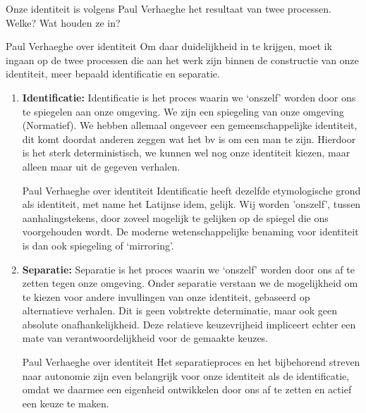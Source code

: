 \documentclass[main.tex]{subfiles}
\begin{document}
\begin{examenvraag}
    \begin{vraag}
        Onze identiteit is volgens Paul Verhaeghe het resultaat van twee processen. Welke? Wat houden ze in?
    \end{vraag}

    \begin{antwoord}
        \begin{citaat}{Paul Verhaeghe over identiteit}
            Om daar duidelijkheid in te krijgen, moet ik ingaan op de twee processen die aan het werk zijn binnen de constructie van onze identiteit, meer bepaald identificatie en separatie.
        \end{citaat}
        \begin{enumerate}
            \item \textbf{Identificatie:}
                Identificatie is het proces waarin we `onszelf' worden door ons te spiegelen aan onze omgeving.
                We zijn een spiegeling van onze omgeving (Normatief). We hebben allemaal
                ongeveer een gemeenschappelijke identiteit, dit komt doordat anderen zeggen wat het bv is
                om een man te zijn. Hierdoor is het sterk deterministisch, we kunnen wel nog onze identiteit
                kiezen, maar alleen maar uit de gegeven verhalen.
                \begin{citaat}{Paul Verhaeghe over identiteit}
                    Identificatie heeft dezelfde etymologische grond als identiteit, met name het Latijnse idem, gelijk.
                    Wij worden 'onszelf', tussen aanhalingstekens, door zoveel mogelijk te gelijken op de spiegel die ons voorgehouden wordt.
                    De moderne wetenschappelijke benaming voor identiteit is dan ook spiegeling of `mirroring'.
                \end{citaat}
            \item \textbf{Separatie:}
                Separatie is het proces waarin we `onszelf' worden door ons af te zetten tegen onze omgeving.
                Onder separatie verstaan we de mogelijkheid om te kiezen voor andere
                invullingen van onze identiteit, gebaseerd op alternatieve verhalen. Dit is geen volstrekte
                determinatie, maar ook geen absolute onafhankelijkheid. Deze relatieve keuzevrijheid
                impliceert echter een mate van verantwoordelijkheid voor de gemaakte keuzes.
                \begin{citaat}{Paul Verhaeghe over identiteit}
                Het separatieproces en het bijbehorend streven naar autonomie zijn even belangrijk voor onze identiteit als de identificatie, omdat we daarmee een eigenheid ontwikkelen door ons af te zetten en actief een keuze te maken.
                \end{citaat}
        \end{enumerate}
    \end{antwoord}
\end{examenvraag}
\end{document}
